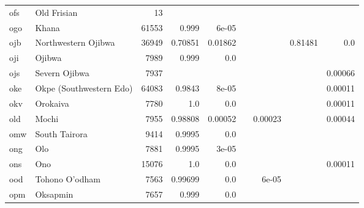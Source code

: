 \documentclass[11pt]{article}
\begin{document}
\begin{table*}[h]
{\begin{tabular}{llrrrrrrr}
ofs         & Old Frisian         & 13         &          &          &          &          &          &          \\

ogo         & Khana         & 61553         & 0.999         & 6e-05         &          &          &          &          \\

ojb         & Northwestern Ojibwa         & 36949         & 0.70851         & 0.01862         &          &          & 0.81481         & 0.0         \\

oji         & Ojibwa         & 7989         & 0.999         & 0.0         &          &          &          &          \\

ojs         & Severn Ojibwa         & 7937         &          &          &          &          &          & 0.00066         \\

oke         & Okpe (Southwestern Edo)         & 64083         & 0.9843         & 8e-05         &          &          &          & 0.00011         \\

okv         & Orokaiva         & 7780         & 1.0         & 0.0         &          &          &          & 0.00011         \\

old         & Mochi         & 7955         & 0.98808         & 0.00052         &          & 0.00023         &          & 0.00044         \\

omw         & South Tairora         & 9414         & 0.9995         & 0.0         &          &          &          &          \\

ong         & Olo         & 7881         & 0.9995         & 3e-05         &          &          &          &          \\

ons         & Ono         & 15076         & 1.0         & 0.0         &          &          &          & 0.00011         \\

ood         & Tohono O'odham         & 7563         & 0.99699         & 0.0         &          & 6e-05         &          &          \\

opm         & Oksapmin         & 7657         & 0.999         & 0.0         &          &          &          &          \\


\end{tabular}}
\end{table*}
\end{document}

